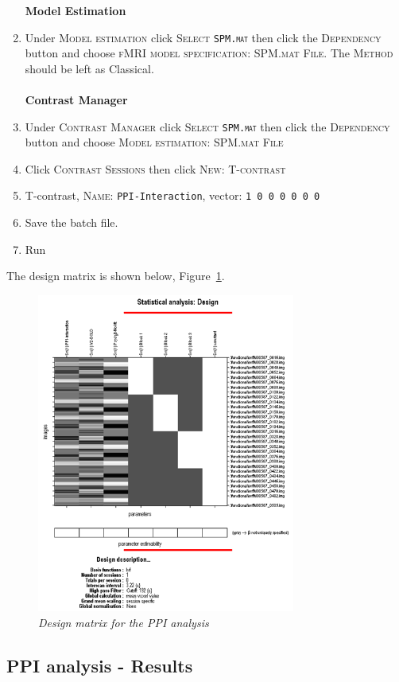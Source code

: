 \begin{enumerate}
\textbf{Model Estimation}
\item Under \textsc{Model estimation} click \textsc{Select \texttt{SPM.mat}} then click the \textsc{Dependency} button and choose \textsc{fMRI model specification: SPM.mat File}. The \textsc{Method} should be left as Classical.\\\\

\textbf{Contrast Manager}
\item Under \textsc{Contrast Manager} click \textsc{Select \texttt{SPM.mat}} then click the \textsc{Dependency} button and choose \textsc{Model estimation: SPM.mat File}
\item Click \textsc{Contrast Sessions} then click \textsc{New: T-contrast}
\item T-contrast, \textsc{Name}: \texttt{PPI-Interaction}, vector: \texttt{1~0~0~0~0~0~0}
\item Save the batch file.
\item Run
\end{enumerate}
The design matrix is shown below, Figure~\ref{fig:ppi14}.

\begin{figure}[ht]
\centering\includegraphics[width=85mm]{ppi/figures/Fig14.png}
\caption{\em Design matrix for the PPI analysis}
\label{fig:ppi14}
\end{figure}

\subsection{PPI analysis - Results}

